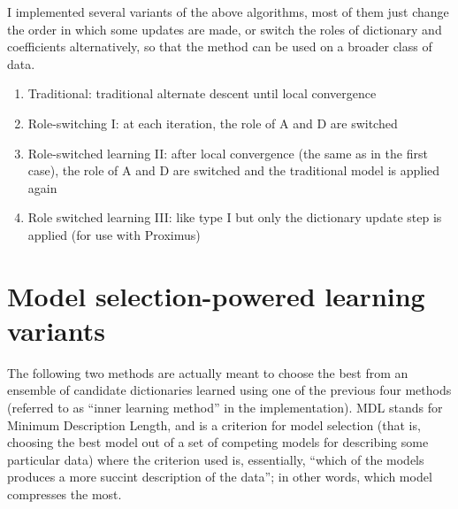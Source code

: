 \documentclass[a4paper]{IEEEtran}
\begin{document}
I implemented several variants of the above algorithms, most of them just change the order in which some updates are made, or switch the roles of dictionary and coefficients alternatively, so that the method can be used on a broader class of data.
 

\begin{enumerate}
\item Traditional: traditional alternate descent until local convergence
\item Role-switching I: at each iteration, the role of A and D are switched
\item Role-switched learning II: after local convergence (the same as in the first case), the role of A and D are switched and the traditional model is applied again
\item Role switched learning III: like type I but only the dictionary update step is applied (for use with Proximus)
\end{enumerate}

\section{Model selection-powered learning variants}

The following two methods are actually meant to choose the best from an ensemble of candidate dictionaries learned using one of the previous four methods (referred to as ``inner learning method'' in the implementation). MDL stands for Minimum Description Length, and is a criterion for model selection (that is, choosing the best model out of a set of competing models for describing some particular data) where the criterion used is, essentially, ``which of the models produces a more succint description of the data''; in other words, which model compresses the most.
 
\end{document}
